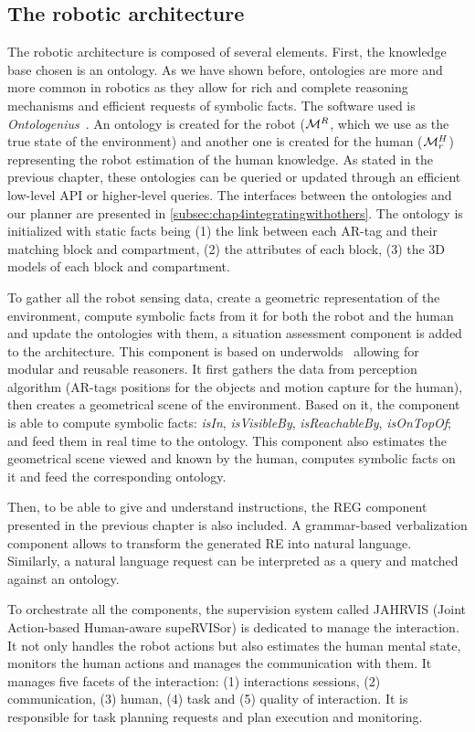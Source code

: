 \documentclass[a4paper,11pt,twoside]{StyleThese}
\begin{document}
\subsection{The robotic architecture}
The robotic architecture is composed of several elements.
First, the knowledge base chosen is an ontology. As we have shown before, ontologies are more and more common in robotics as they allow for rich and complete reasoning mechanisms and efficient requests of symbolic facts. The software used is \textit{Ontologenius}~\cite{sarthou2019ontologenius}. An ontology is created for the robot ($\mathcal{M}^R$, which we use as the true state of the environment) and another one is created for the human ($\mathcal{M}^H_r$) representing the robot estimation of the human knowledge. As stated in the previous chapter, these ontologies can be queried or updated through an efficient low-level API or higher-level \sparql{} queries. The interfaces between the ontologies and our planner are presented in \ref{subsec:chap4integratingwithothers}. The ontology is initialized with static facts being (1) the link between each AR-tag and their matching block and compartment, (2) the attributes of each block, (3) the 3D models of each block and compartment.

To gather all the robot sensing data, create a geometric representation of the environment, compute symbolic facts from it for both the robot and the human and update the ontologies with them, a situation assessment component is added to the architecture. This component is based on underwolds~\cite{lemaignan2018underworlds} allowing for modular and reusable reasoners. It first gathers the data from perception algorithm (AR-tags positions for the objects and motion capture for the human), then creates a geometrical scene of the environment. Based on it, the component is able to compute symbolic facts: \textit{isIn}, \textit{isVisibleBy}, \textit{isReachableBy}, \textit{isOnTopOf}; and feed them in real time to the ontology. This component also estimates the geometrical scene viewed and known by the human, computes symbolic facts on it and feed the corresponding ontology.

Then, to be able to give and understand instructions, the REG component presented in the previous chapter is also included. A grammar-based verbalization component allows to transform the generated RE into natural language. Similarly, a natural language request can be interpreted as a \sparql{} query and matched against an ontology.

To orchestrate all the components, the supervision system called JAHRVIS (Joint Action-based Human-aware supeRVISor) is dedicated to manage the interaction. It not only handles the robot actions but also estimates the human mental state, monitors the human actions and manages the communication with them. It manages five facets of the interaction: (1) interactions sessions, (2) communication, (3) human, (4) task and (5) quality of interaction. It is responsible for task planning requests and plan execution and monitoring.
\end{document}
